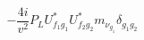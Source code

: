 %
\begin{dmath*}
%
  -  \frac{4 i}{v^2}P_L U_{f_1 g_1}^* U_{f_2 g_2}^* m_{\nu_{g_1}} \delta_{g_1 g_2}
%
\end{dmath*}
%
